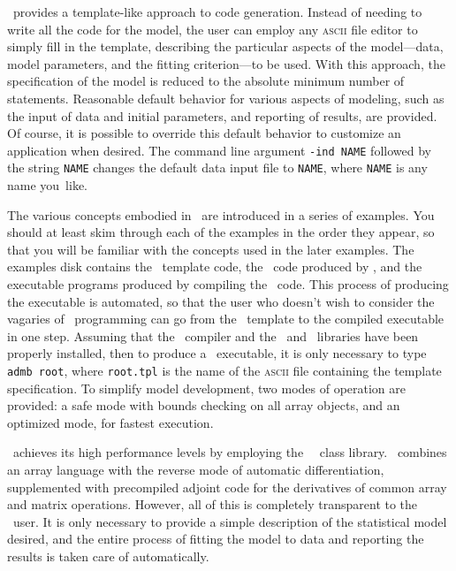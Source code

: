 \documentclass{admbmanual}
\begin{document}
\ADM\ provides a template-like approach to code generation. Instead of needing
to write all the code for the model, the user can employ any \textsc{ascii} file
editor to simply fill in the template, describing the particular aspects of the
model---data, model parameters, and the fitting criterion---to be used. With
this approach, the specification of the model is reduced to the absolute minimum
number of statements. Reasonable default behavior for various aspects of
modeling, such as the input of data and initial parameters, and reporting of
results, are provided. Of course, it is possible to override this default
behavior to customize an application when desired. The command line argument
\texttt{-ind NAME} followed by the string \texttt{NAME} changes the default data
input file to \texttt{NAME}, where \texttt{NAME} is any name you~like.

The various concepts embodied in \ADM\ are introduced in a series of examples.
You should at least skim through each of the examples in the order they appear,
so that you will be familiar with the concepts used in the later examples. The
examples disk contains the \ADM\ template code, the \cplus\ code produced by
\ADM, and the executable programs produced by compiling the \cplus\ code. This
process of producing the executable is automated, so that the user who doesn't
wish to consider the vagaries of \cplus\ programming can go from the \ADM\
template to the compiled executable in one step. Assuming that the \cplus\
compiler and the \ADM\ and \scAD\ libraries have been properly installed, then
to produce a \ADM\ executable, it is only necessary to type \texttt{admb
  root}, where \texttt{root.tpl} is the name of the \textsc{ascii} file
containing the template specification. To simplify model development, two modes
of operation are provided: a safe mode with bounds checking on all array
objects, and an optimized mode, for fastest execution.

\ADM\ achieves its high performance levels by employing the \scAD\ \cplus\ class
library. \scAD\ combines an array language with the reverse mode of automatic
differentiation, supplemented with precompiled adjoint code for the derivatives
of common array and matrix operations. However, all of this is completely
transparent to the \ADM\ user. It is only necessary to provide a simple
description of the statistical model desired, and the entire process of fitting
the model to data and reporting the results is taken care of automatically.
\end{document}
